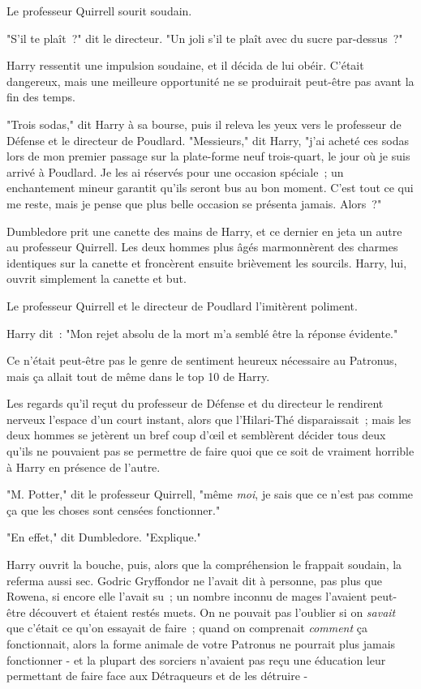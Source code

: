 Le professeur Quirrell sourit soudain.

"S'il te plaît~?" dit le directeur. "Un joli s'il te plaît avec du sucre par-dessus~?"

Harry ressentit une impulsion soudaine, et il décida de lui obéir. C'était dangereux, mais une meilleure opportunité ne se produirait peut-être pas avant la fin des temps.

"Trois sodas," dit Harry à sa bourse, puis il releva les yeux vers le professeur de Défense et le directeur de Poudlard. "Messieurs," dit Harry, "j'ai acheté ces sodas lors de mon premier passage sur la plate-forme neuf trois-quart, le jour où je suis arrivé à Poudlard. Je les ai réservés pour une occasion spéciale~; un enchantement mineur garantit qu'ils seront bus au bon moment. C'est tout ce qui me reste, mais je pense que plus belle occasion se présenta jamais. Alors~?"

Dumbledore prit une canette des mains de Harry, et ce dernier en jeta un autre au professeur Quirrell. Les deux hommes plus âgés marmonnèrent des charmes identiques sur la canette et froncèrent ensuite brièvement les sourcils. Harry, lui, ouvrit simplement la canette et but.

Le professeur Quirrell et le directeur de Poudlard l'imitèrent poliment.

Harry dit~: "Mon rejet absolu de la mort m'a semblé être la réponse évidente."

Ce n'était peut-être pas le genre de sentiment heureux nécessaire au Patronus, mais ça allait tout de même dans le top 10 de Harry.

Les regards qu'il reçut du professeur de Défense et du directeur le rendirent nerveux l'espace d'un court instant, alors que l'Hilari-Thé disparaissait~; mais les deux hommes se jetèrent un bref coup d'œil et semblèrent décider tous deux qu'ils ne pouvaient pas se permettre de faire quoi que ce soit de vraiment horrible à Harry en présence de l'autre.

"M. Potter," dit le professeur Quirrell, "même \emph{moi}, je sais que ce n'est pas comme ça que les choses sont censées fonctionner."

"En effet," dit Dumbledore. "Explique."

Harry ouvrit la bouche, puis, alors que la compréhension le frappait soudain, la referma aussi sec. Godric Gryffondor ne l'avait dit à personne, pas plus que Rowena, si encore elle l'avait su~; un nombre inconnu de mages l'avaient peut-être découvert et étaient restés muets. On ne pouvait pas l'oublier si on \emph{savait} que c'était ce qu'on essayait de faire~; quand on comprenait \emph{comment} ça fonctionnait, alors la forme animale de votre Patronus ne pourrait plus jamais fonctionner - et la plupart des sorciers n'avaient pas reçu une éducation leur permettant de faire face aux Détraqueurs et de les détruire -

